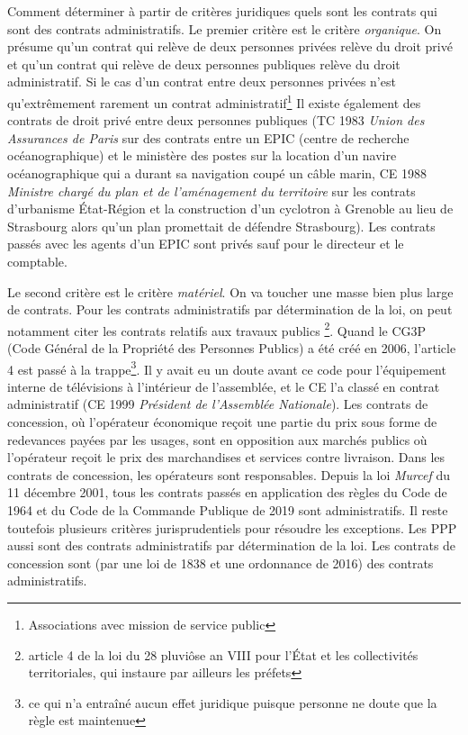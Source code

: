\documentclass[math]{cours}
\begin{document}
Comment déterminer à partir de critères juridiques quels sont les contrats qui sont des contrats administratifs.
Le premier critère est le critère \emph{organique}.
On présume qu'un contrat qui relève de deux personnes privées relève du droit privé et qu'un contrat qui relève de deux personnes publiques relève du droit administratif.
Si le cas d'un contrat entre deux personnes privées n'est qu'extrêmement rarement un contrat administratif\footnote{Associations avec mission de service public}
Il existe également des contrats de droit privé entre deux personnes publiques
(TC 1983 \emph{Union des Assurances de Paris} sur des contrats entre un EPIC (centre de recherche océanographique) et le ministère des postes sur la location d'un navire océanographique qui a durant sa navigation coupé un câble marin,
CE 1988 \emph{Ministre chargé du plan et de l'aménagement du territoire} sur les contrats d'urbanisme État-Région et la construction d'un cyclotron à Grenoble au lieu de Strasbourg alors qu'un plan promettait de défendre Strasbourg).
Les contrats passés avec les agents d'un EPIC sont privés sauf pour le directeur et le comptable.

Le second critère est le critère \emph{matériel}.
On va toucher une masse bien plus large de contrats.
Pour les contrats administratifs par détermination de la loi, on peut notamment citer les contrats relatifs aux travaux publics \footnote{article 4 de la loi du 28 pluviôse an VIII pour l'État et les collectivités territoriales, qui instaure par ailleurs les préfets}.
Quand le CG3P (Code Général de la Propriété des Personnes Publics) a été créé en 2006, l'article 4 est passé à la trappe\footnote{ce qui n'a entraîné aucun effet juridique puisque personne ne doute que la règle est maintenue}.
Il y avait eu un doute avant ce code pour l'équipement interne de télévisions à l'intérieur de l'assemblée, et le CE l'a classé en contrat administratif (CE 1999 \emph{Président de l'Assemblée Nationale}).
Les contrats de concession, où l'opérateur économique reçoit une partie du prix sous forme de redevances payées par les usages, sont en opposition aux marchés publics où l'opérateur reçoit le prix des marchandises et services contre livraison.
Dans les contrats de concession, les opérateurs sont responsables.
Depuis la loi \emph{Murcef} du 11 décembre 2001, tous les contrats passés en application des règles du Code de 1964 et du Code de la Commande Publique de 2019 sont administratifs.
Il reste toutefois plusieurs critères jurisprudentiels pour résoudre les exceptions.
Les PPP aussi sont des contrats administratifs par détermination de la loi.
Les contrats de concession sont (par une loi de 1838 et une ordonnance de 2016) des contrats administratifs.
\end{document}
